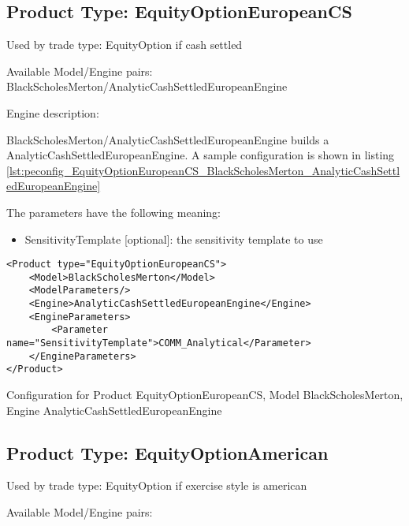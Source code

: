 \subsection{Product Type: EquityOptionEuropeanCS}

Used by trade type: EquityOption if cash settled

Available Model/Engine pairs: BlackScholesMerton/AnalyticCashSettledEuropeanEngine

Engine description:

BlackScholesMerton/AnalyticCashSettledEuropeanEngine builds a AnalyticCashSettledEuropeanEngine. A sample configuration is shown in listing
\ref{lst:peconfig_EquityOptionEuropeanCS_BlackScholesMerton_AnalyticCashSettledEuropeanEngine}

The parameters have the following meaning:

\begin{itemize}
\item SensitivityTemplate [optional]: the sensitivity template to use 
\end{itemize}

\begin{longlisting}
\begin{verbatim}
<Product type="EquityOptionEuropeanCS">
    <Model>BlackScholesMerton</Model>
    <ModelParameters/>
    <Engine>AnalyticCashSettledEuropeanEngine</Engine>
    <EngineParameters>
        <Parameter name="SensitivityTemplate">COMM_Analytical</Parameter>
    </EngineParameters>
</Product>
\end{verbatim}
\caption{Configuration for Product EquityOptionEuropeanCS, Model BlackScholesMerton, Engine AnalyticCashSettledEuropeanEngine}
\label{lst:peconfig_EquityOptionEuropeanCS_BlackScholesMerton_AnalyticCashSettledEuropeanEngine}
\end{longlisting}

\subsection{Product Type: EquityOptionAmerican}

Used by trade type: EquityOption if exercise style is american

Available Model/Engine pairs:

